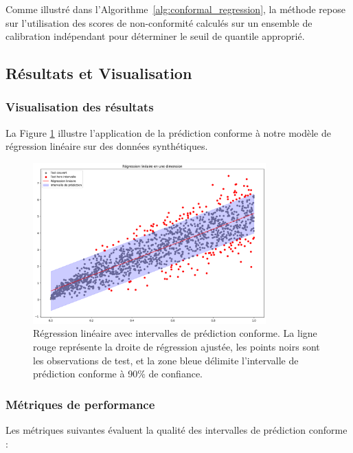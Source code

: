 \documentclass[a4paper,12pt]{article}
\begin{document}
Comme illustré dans l'Algorithme~\ref{alg:conformal_regression}, la méthode repose sur l'utilisation des scores de non-conformité calculés sur un ensemble de calibration indépendant pour déterminer le seuil de quantile approprié.


\subsection{Résultats et Visualisation}

\subsubsection{Visualisation des résultats}

La Figure \ref{fig:regression_conforme} illustre l'application de la prédiction conforme à notre modèle de régression linéaire sur des données synthétiques.

\begin{figure}[h]
\centering
\includegraphics[width=0.8\textwidth]{conformal_prediction_regression.png}
\caption{Régression linéaire avec intervalles de prédiction conforme. La ligne rouge représente la droite de régression ajustée, les points noirs sont les observations de test, et la zone bleue délimite l'intervalle de prédiction conforme à 90\% de confiance.}
\label{fig:regression_conforme}
\end{figure}

\subsubsection{Métriques de performance}

Les métriques suivantes évaluent la qualité des intervalles de prédiction conforme :\\
\end{document}
